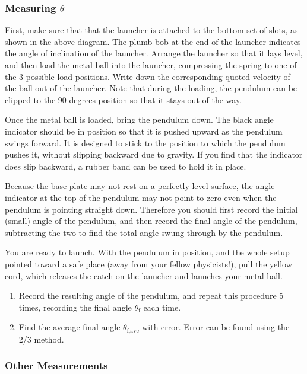 \subsubsection{Measuring $\theta$}\label{subsubsec:theta}

First, make sure that that the launcher is attached to the bottom set of slots, as shown in the above diagram. The plumb bob at the end of the launcher indicates the angle of inclination of the launcher.  Arrange the launcher so that it lays level, and then load the metal ball into the launcher, compressing the spring to one of the 3 possible load positions. Write down the corresponding quoted velocity of the ball out of the launcher.  Note that during the loading, the pendulum can be clipped to the 90 degrees position so that it stays out of the way. \myskip

Once the metal ball is loaded, bring the pendulum down.  The black angle indicator should be in position so that it is pushed upward as the pendulum swings forward.  It is designed to stick to the position to which the pendulum pushes it, without slipping backward due to gravity.  If you find that the indicator does slip backward, a rubber band can be used to hold it in place. \myskip

Because the base plate may not rest on a perfectly level surface, the angle indicator at the top of the pendulum may not point to zero even when the pendulum is pointing straight down.  Therefore you should first record the initial (small) angle of the pendulum, and then record the final angle of the pendulum, subtracting the two to find the total angle swung through by the pendulum.\myskip

You are ready to launch.  With the pendulum in position, and the whole setup pointed toward a safe place (away from your fellow physicists!), pull the yellow cord, which releases the catch on the launcher and launches your metal ball.
\begin{enumerate}
\item Record the resulting angle of the pendulum, and repeat this procedure 5 times, recording the final angle $\theta_\text{f}$ each time.
\item Find the average final angle $\theta_\text{f,ave}$ with error. Error can be found using the 2/3 method.
\end{enumerate}


\subsubsection{Other Measurements}

